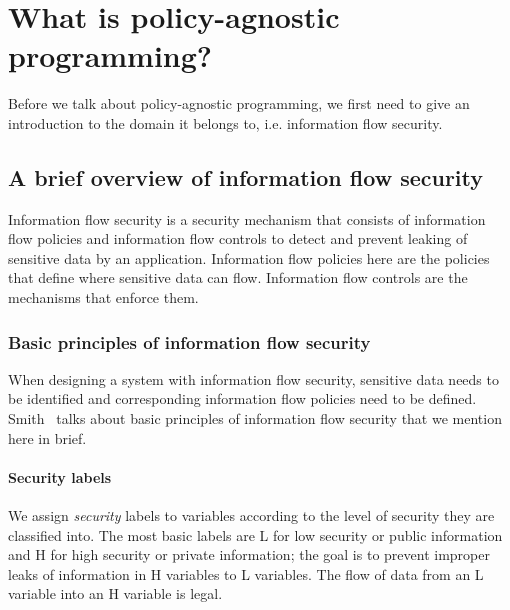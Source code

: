 \chapter{What is policy-agnostic programming?\label{chap:PAP}}

Before we talk about policy-agnostic programming, we first need to give an
introduction to the domain it belongs to, i.e. information flow security.

\section{A brief overview of information flow security}

Information flow security is a security mechanism that consists of information flow
policies and information flow controls to detect and prevent leaking of sensitive
data by an application. Information flow policies here are the policies that define
where sensitive data can flow. Information flow controls are the mechanisms that
enforce them.

\subsection{Basic principles of information flow security}
When designing a system with information flow security, sensitive data needs to
be identified and corresponding information flow policies need to be defined.
Smith~\cite{PrincInfoSec} talks about basic principles of information flow security
that we mention here in brief.
\subsubsection{Security labels}
We assign \textit{security} labels to variables
according to the level of security they are classified into. The most basic labels
are L for low security or public information and H for high security or private
information; the goal is to prevent improper leaks of information in H variables to
L variables. The flow of data from an L variable into an H variable is legal.

